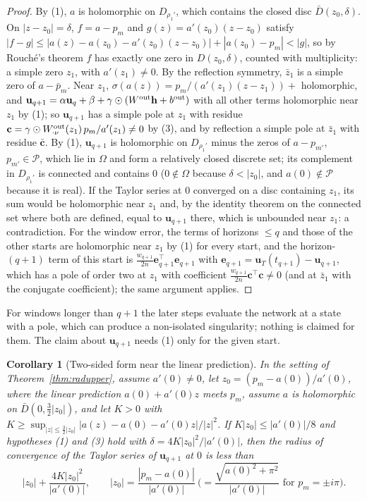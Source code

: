 \documentclass[11pt]{article}
\newtheorem{corollary}{Corollary}
\theoremstyle{definition}
\theoremstyle{remark}
\newcommand{\uu}{\mathbf{u}}
\newcommand{\ee}{\mathbf{e}}
\begin{document}
\begin{proof}
By (1), $a$ is holomorphic on $D_{\rho_1'}$, which contains the closed disc $\bar D(z_0,\delta)$. On $|z-z_0|=\delta$, $f=a-p_m$ and $g(z)=a'(z_0)(z-z_0)$ satisfy $|f-g|\le|a(z)-a(z_0)-a'(z_0)(z-z_0)|+|a(z_0)-p_m|<|g|$, so by Rouché's theorem $f$ has exactly one zero in $D(z_0,\delta)$, counted with multiplicity: a simple zero $z_1$, with $a'(z_1)\ne0$. By the reflection symmetry, $\bar z_1$ is a simple zero of $a-\bar p_m$.
Near $z_1$, $\sigma(a(z))=p_m/(a'(z_1)(z-z_1))+$ holomorphic, and $\uu_{q+1}=\alpha\uu_q+\beta+\gamma\odot(W^{\rm out}\mathbf h+b^{\rm out})$ with all other terms holomorphic near $z_1$ by (1); so $\uu_{q+1}$ has a simple pole at $z_1$ with residue $\mathbf c=\gamma\odot W^{\rm out}_{\cdot\nu}(z_1)\,p_m/a'(z_1)\ne0$ by (3), and by reflection a simple pole at $\bar z_1$ with residue $\bar{\mathbf c}$.
By (1), $\uu_{q+1}$ is holomorphic on $D_{\rho_1'}$ minus the zeros of $a-p_{m'}$, $p_{m'}\in\mathcal P$, which lie in $\Omega$ and form a relatively closed discrete set; its complement in $D_{\rho_1'}$ is connected and contains $0$ ($0\notin\Omega$ because $\delta<|z_0|$, and $a(0)\notin\mathcal P$ because it is real). If the Taylor series at $0$ converged on a disc containing $z_1$, its sum would be holomorphic near $z_1$ and, by the identity theorem on the connected set where both are defined, equal to $\uu_{q+1}$ there, which is unbounded near $z_1$: a contradiction.
For the window error, the terms of horizons $\le q$ and those of the other starts are holomorphic near $z_1$ by (1) for every start, and the horizon-$(q+1)$ term of this start is $\tfrac{w_{q+1}}{2n}\ee_{q+1}^\top\ee_{q+1}$ with $\ee_{q+1}=\uu_T(t_{q+1})-\uu_{q+1}$, which has a pole of order two at $z_1$ with coefficient $\tfrac{w_{q+1}}{2n}\mathbf c^\top\mathbf c\ne0$ (and at $\bar z_1$ with the conjugate coefficient); the same argument applies.
\end{proof}

For windows longer than $q+1$ the later steps evaluate the network at a state with a pole, which can produce a non-isolated singularity; nothing is claimed for them.
The claim about $\uu_{q+1}$ needs (1) only for the given start.

\begin{corollary}[Two-sided form near the linear prediction]\label{cor:radtwo}
In the setting of Theorem~\ref{thm:radupper}, assume $a'(0)\ne0$, let $z_0=(p_m-a(0))/a'(0)$, where the linear prediction $a(0)+a'(0)z$ meets $p_m$, assume $a$ is holomorphic on $\bar D(0,\tfrac32|z_0|)$, and let $K>0$ with $K\ge\sup_{|z|\le\frac32|z_0|}|a(z)-a(0)-a'(0)z|/|z|^2$.
If $K|z_0|\le|a'(0)|/8$ and hypotheses (1) and (3) hold with $\delta=4K|z_0|^2/|a'(0)|$, then the radius of convergence of the Taylor series of $\uu_{q+1}$ at $0$ is less than
\[
|z_0|+\frac{4K|z_0|^2}{|a'(0)|},\qquad |z_0|=\frac{|p_m-a(0)|}{|a'(0)|}\ \Big(=\frac{\sqrt{a(0)^2+\pi^2}}{|a'(0)|}\text{ for }p_m=\pm i\pi\Big).
\]
\end{corollary}
\end{document}
